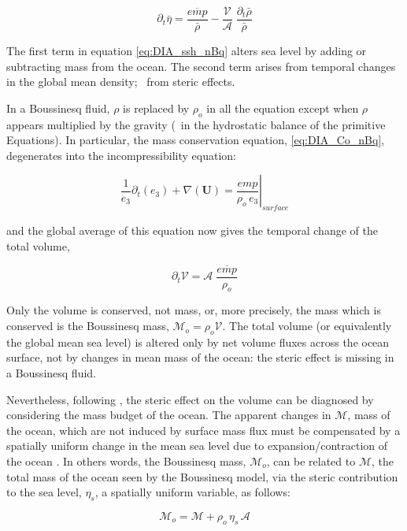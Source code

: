 \documentclass[../main/NEMO_manual]{subfiles}
\begin{document}
\begin{equation}
  \partial_t \bar{\eta} = \frac{\overline{\textit{emp}}}{ \bar{\rho}}
  - \frac{\mathcal{V}}{\mathcal{A}} \;\frac{\partial_t \bar{\rho} }{\bar{\rho}}
  \label{eq:DIA_ssh_nBq}
\end{equation}

The first term in equation \autoref{eq:DIA_ssh_nBq} alters sea level by adding or subtracting mass from the ocean.
The second term arises from temporal changes in the global mean density; \ie\ from steric effects.

In a Boussinesq fluid, $\rho$ is replaced by $\rho_o$ in all the equation except when $\rho$ appears multiplied by
the gravity (\ie\ in the hydrostatic balance of the primitive Equations).
In particular, the mass conservation equation, \autoref{eq:DIA_Co_nBq}, degenerates into the incompressibility equation:

\[
  \frac{1}{e_3} \partial_t ( e_3 ) + \nabla( \textbf{U} ) = \left. \frac{\textit{emp}}{\rho_o \,e_3}\right|_ \textit{surface}
\]

and the global average of this equation now gives the temporal change of the total volume,

\[
  \partial_t \mathcal{V} = \mathcal{A} \;\frac{\overline{\textit{emp}}}{\rho_o}
\]

Only the volume is conserved, not mass, or, more precisely, the mass which is conserved is the Boussinesq mass,
$\mathcal{M}_o = \rho_o \mathcal{V}$.
The total volume (or equivalently the global mean sea level) is altered only by net volume fluxes across
the ocean surface, not by changes in mean mass of the ocean: the steric effect is missing in a Boussinesq fluid.

Nevertheless, following \citep{greatbatch_JGR94}, the steric effect on the volume can be diagnosed by
considering the mass budget of the ocean.
The apparent changes in $\mathcal{M}$, mass of the ocean, which are not induced by surface mass flux
must be compensated by a spatially uniform change in the mean sea level due to expansion/contraction of the ocean
\citep{greatbatch_JGR94}.
In others words, the Boussinesq mass, $\mathcal{M}_o$, can be related to $\mathcal{M}$,
the total mass of the ocean seen by the Boussinesq model, via the steric contribution to the sea level,
$\eta_s$, a spatially uniform variable, as follows:

\begin{equation}
  \mathcal{M}_o = \mathcal{M} + \rho_o \,\eta_s \,\mathcal{A}
  \label{eq:DIA_M_Bq}
\end{equation}
\end{document}
